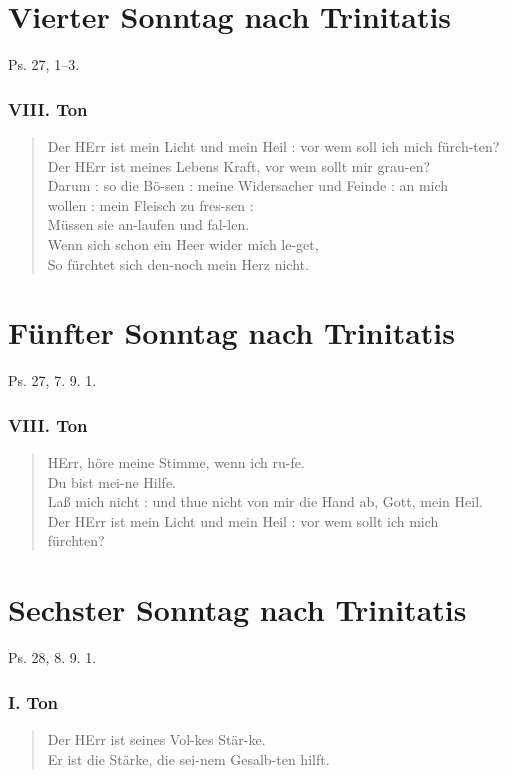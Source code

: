 \section{Vierter Sonntag nach Trinitatis}

Ps. 27, 1–3.

\subsubsection{VIII. Ton}
\begin{verse}
Der HErr ist mein Licht und mein Heil : vor wem soll ich mich fürch-ten?\\
Der HErr ist meines Lebens Kraft, vor wem sollt mir grau-en?\\
Darum : so die Bö-sen : meine Widersacher und Feinde : an mich\\
wollen : mein Fleisch zu fres-sen :\\
Müssen sie an-laufen und fal-len.\\
Wenn sich schon ein Heer wider mich le-get,\\
So fürchtet sich den-noch mein Herz nicht.
\end{verse}

\section{Fünfter Sonntag nach Trinitatis}

Ps. 27, 7. 9. 1.

\subsubsection{VIII. Ton}
\begin{verse}
HErr, höre meine Stimme, wenn ich ru-fe.\\
Du bist mei-ne Hilfe.\\
Laß mich nicht : und thue nicht von mir die Hand ab, Gott, mein Heil.\\
Der HErr ist mein Licht und mein Heil : vor wem sollt ich mich\\
fürchten?
\end{verse}

\section{Sechster Sonntag nach Trinitatis}

Ps. 28, 8. 9. 1.

\subsubsection{I. Ton}
\begin{verse}
Der HErr ist seines Vol-kes Stär-ke.\\
Er ist die Stärke, die sei-nem Gesalb-ten hilft.
\end{verse}

